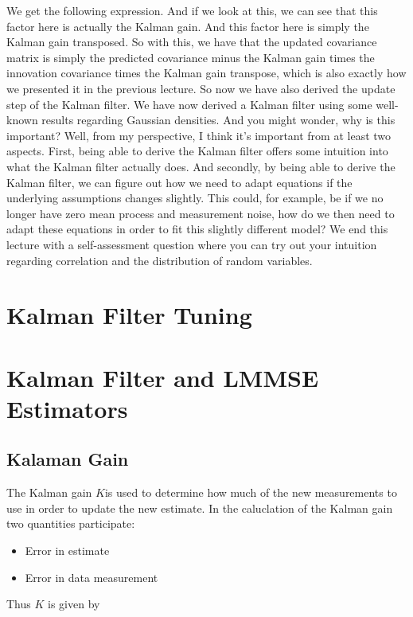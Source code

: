 We get the following expression.
And if we look at this, we can see that this factor here
is actually the Kalman gain.
And this factor here is simply the Kalman gain transposed.
So with this, we have that the updated covariance matrix
is simply the predicted covariance
minus the Kalman gain times the innovation
covariance times the Kalman gain transpose, which
is also exactly how we presented it in the previous lecture.
So now we have also derived the update step
of the Kalman filter.
We have now derived a Kalman filter
using some well-known results regarding Gaussian densities.
And you might wonder, why is this important?
Well, from my perspective, I think
it's important from at least two aspects.
First, being able to derive the Kalman filter
offers some intuition into what the Kalman filter actually
does.
And secondly, by being able to derive the Kalman filter,
we can figure out how we need to adapt equations
if the underlying assumptions changes slightly.
This could, for example, be if we no longer
have zero mean process and measurement noise,
how do we then need to adapt these equations in order to fit
this slightly different model?
We end this lecture with a self-assessment question
where you can try out your intuition regarding correlation
and the distribution of random variables.


\section{Kalman Filter Tuning}
\label{kalman_filter_tuning}

\section{Kalman Filter and LMMSE Estimators}



\subsection{Kalaman Gain}
The Kalman gain $K$is used to determine how much of the new measurements to use in order to update the new estimate.
In the caluclation of the Kalman gain two quantities participate:

\begin{itemize}
\item Error in estimate
\item Error in data measurement
\end{itemize}

Thus $K$ is given by

